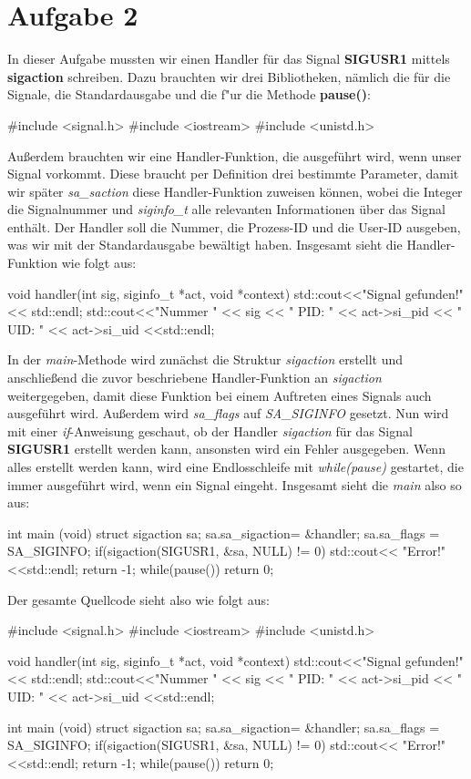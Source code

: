 \documentclass{ti2}
\begin{document}
\section*{Aufgabe 2}
In dieser Aufgabe mussten wir einen Handler für das Signal \textbf{SIGUSR1} mittels \textbf{sigaction} schreiben. Dazu brauchten wir drei Bibliotheken, nämlich die für die Signale, die Standardausgabe und die f"ur die Methode \textbf{pause()}:
\begin{listing}{0}
#include <signal.h>
#include <iostream>
#include <unistd.h>
\end{listing}
Außerdem brauchten wir eine Handler-Funktion, die ausgeführt wird, wenn unser Signal vorkommt. Diese braucht per Definition drei bestimmte Parameter, damit wir später \emph{sa\_saction} diese Handler-Funktion zuweisen können, wobei die Integer die Signalnummer und \emph{siginfo\_t} alle relevanten Informationen über das Signal enthält.
Der Handler soll die Nummer, die Prozess-ID und die User-ID ausgeben, was wir mit der Standardausgabe bewältigt haben. Insgesamt sieht die Handler-Funktion wie folgt aus:
\begin{listing}{4}
void handler(int sig, siginfo_t *act, void *context)
{
  std::cout<<"Signal gefunden!" << std::endl;
  std::cout<<"Nummer " << sig << "  PID: " <<  act->si_pid <<  "  UID: " 
  	<<  act->si_uid <<std::endl;
}
\end{listing}
In der \emph{main}-Methode wird zunächst die Struktur \emph{sigaction} erstellt und anschließend die zuvor beschriebene Handler-Funktion an \emph{sigaction} weitergegeben, damit diese Funktion bei einem Auftreten eines Signals auch ausgeführt wird. Außerdem wird \emph{sa\_flags} auf \emph{SA\_SIGINFO} gesetzt. Nun wird mit einer \emph{if}-Anweisung geschaut, ob der Handler \emph{sigaction} für das Signal \textbf{SIGUSR1} erstellt werden kann, ansonsten wird ein Fehler ausgegeben. Wenn alles erstellt werden kann, wird eine Endlosschleife mit \emph{while(pause)} gestartet, die immer ausgeführt wird, wenn ein Signal eingeht. Insgesamt sieht die \emph{main} also so aus:
\begin{listing}{10}
int main (void)
{
  struct sigaction sa;
  sa.sa_sigaction= &handler;
  sa.sa_flags = SA_SIGINFO;
  if(sigaction(SIGUSR1, &sa, NULL) != 0)
    {
      std::cout<< "Error!"<<std::endl;
      return -1;
    }
  while(pause())
    {
    }
    return 0;
}
\end{listing}
Der gesamte Quellcode sieht also wie folgt aus:
\begin{listing}{0}
#include <signal.h>
#include <iostream>
#include <unistd.h>

void handler(int sig, siginfo_t *act, void *context)
{
  std::cout<<"Signal gefunden!" << std::endl;
  std::cout<<"Nummer " << sig << "  PID: " <<  act->si_pid <<  "  UID: " <<  act->si_uid <<std::endl;
}

int main (void)
{
  struct sigaction sa;
  sa.sa_sigaction= &handler;
  sa.sa_flags = SA_SIGINFO;
  if(sigaction(SIGUSR1, &sa, NULL) != 0)
    {
      std::cout<< "Error!"<<std::endl;
      return -1;
    }
  while(pause())
    {
    }
    return 0;
}
\end{listing}
\end{document}
